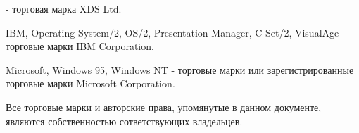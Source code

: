 \begin{titlepage}
{\XDS{} - торговая марка XDS Ltd.

\ifcommon \else %
  \ifosii
    IBM, Operating System/2, OS/2, Presentation Manager, C Set/2, VisualAge
    - торговые марки IBM Corporation.
  \fi

  \ifwinnt
    Microsoft, Windows 95, Windows NT - торговые марки или зарегистрированные
    торговые марки Microsoft Corporation.
  \fi
\fi

Все торговые марки и авторские права, упомянутые в данном документе,
являются собственностью сответствующих владельцев.

} %
\end{titlepage}

